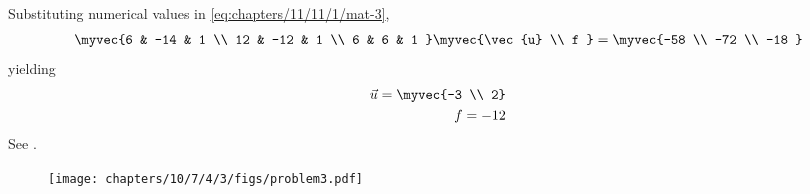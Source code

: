 Substituting numerical values in 
	\eqref{eq:chapters/11/11/1/mat-3},
\begin{align}
 \myvec{6 & -14 & 1 \\
	12 & -12 & 1 \\
	6 & 6 & 1
	} \myvec {\vec{u} \\
	           f 
		}  = \myvec{-58 \\ -72 \\ -18 }
\end{align}
yielding
\begin{align}
	\vec{u} = \myvec{-3 \\ 2} \\ 
	f = -12 
\end{align}
See .
\begin{figure}[H]
	\begin{center}
		\texttt{[image: chapters/10/7/4/3/figs/problem3.pdf]}
	\end{center}
\caption{}
\label{fig:10/7/4/3Fig1}
\end{figure}

